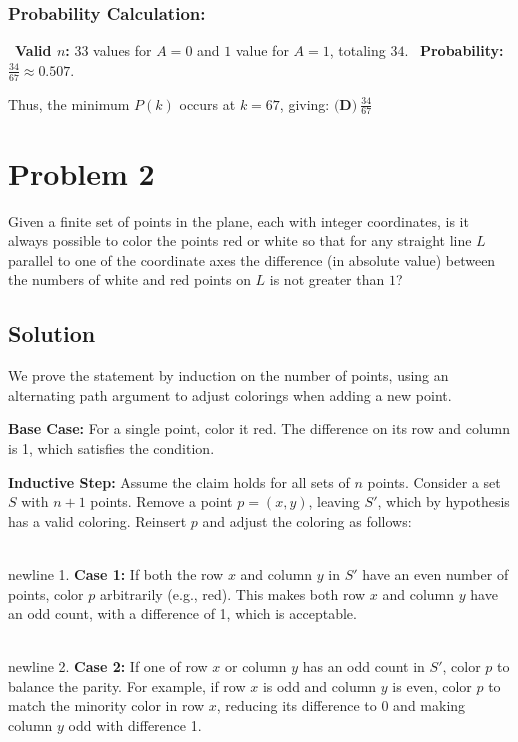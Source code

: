 \documentclass{article}
\begin{document}
\subsubsection*{Probability Calculation:}
\noindent \textbullet\ \textbf{Valid \( n \):} \( 33 \) values for \( A = 0 \) and \( 1 \) value for \( A = 1 \), totaling \( 34 \).
\noindent \textbullet\ \textbf{Probability:} \( \frac{34}{67} \approx 0.507 \).

Thus, the minimum \( P(k) \) occurs at \( k = 67 \), giving:
\(
\boxed{\textbf{(D)} \ \frac{34}{67}}
\)
\hrulefill
\newpage
\section*{Problem 2}
Given a finite set of points in the plane, each with integer coordinates, is it always possible to color the points red or white so that for any straight line \(L\) parallel to one of the coordinate axes the difference (in absolute value) between the numbers of white and red points on \(L\) is not greater than \(1\)?

\subsection*{Solution}
We prove the statement by induction on the number of points, using an alternating path argument to adjust colorings when adding a new point.

\textbf{Base Case:} For a single point, color it red. The difference on its row and column is 1, which satisfies the condition.

\textbf{Inductive Step:} Assume the claim holds for all sets of \( n \) points. Consider a set \( S \) with \( n+1 \) points. Remove a point \( p = (x, y) \), leaving \( S' \), which by hypothesis has a valid coloring. Reinsert \( p \) and adjust the coloring as follows:

\\newline 1. \textbf{Case 1:} If both the row \( x \) and column \( y \) in \( S' \) have an even number of points, color \( p \) arbitrarily (e.g., red). This makes both row \( x \) and column \( y \) have an odd count, with a difference of 1, which is acceptable.

\\newline 2. \textbf{Case 2:} If one of row \( x \) or column \( y \) has an odd count in \( S' \), color \( p \) to balance the parity. For example, if row \( x \) is odd and column \( y \) is even, color \( p \) to match the minority color in row \( x \), reducing its difference to 0 and making column \( y \) odd with difference 1.
\end{document}
